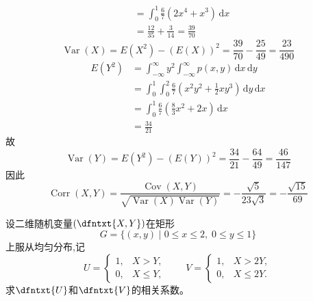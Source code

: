 \documentclass[../main.tex]{subfiles}
\begin{document}
\begin{solution}
\[\begin{aligned}
     &= \int_{0}^{1}\frac{6}{7}\left( 2x^{4}+ x^{3} \right)\,\mathrm{d} x\\ 
      &= \frac{12 }{35 }+ \frac{3}{14}= \frac{39}{70}      
   \end{aligned}
   \] \[
   \operatorname{Var}\left( X \right)= E\left( X^{2} \right)-\left( E\left( X \right)  \right)^{2}= \frac{39}{70}- \frac{25}{49}= \frac{23 }{490 }    
   \] \[
   \begin{aligned}
   E\left( Y^{2} \right)&= \int_{-\infty}^{\infty}y^{2}\int_{-\infty}^{\infty}p\left( x,y \right)\,\mathrm{d} x\,\mathrm{d} y\\ 
    &= \int_{0}^{1}\int_{0}^{2}\frac{6}{7}\left( x^{2}y^{2}+ \frac{1}{2}xy^{3} \right)\,\mathrm{d} y\,\mathrm{d} x\\ 
     &= \int_{0}^{1}\frac{6}{7}\left( \frac{8}{3}x^{2}+ 2x \right)\,\mathrm{d} x\\ 
      &=\frac{34 }{21 } 
   \end{aligned}
   \]故 \[
   \operatorname{Var}\left( Y \right)= E\left( Y^{2} \right)- \left( E\left( Y \right)  \right)^{2}= \frac{34 }{21 }- \frac{64}{49}= \frac{46 }{147 }     
   \]因此 \[
   \operatorname{Corr}\left( X,Y \right)= \frac{\operatorname{Cov}\left( X,Y \right)  }{\sqrt{\operatorname{Var}\left( X \right)\operatorname{Var}\left( Y \right)  } }  =- \frac{\sqrt{5}}{23  \sqrt{3}} = -\frac{\sqrt{15} }{69 } 
   \]
\end{solution}


\begin{exercise}{}{}
设二维随机变量\((\dfntxt{X,Y})\)在矩形
\[
G=\{(x,y)\mid 0\leq x\leq 2,\;0\leq y\leq 1\}
\]
上服从均匀分布,记
\[
U=
\begin{cases}
1, & X>Y,\\
0, & X\leq Y,
\end{cases}
\qquad
V=
\begin{cases}
1, & X>2Y,\\
0, & X\leq 2Y.
\end{cases}
\]
求\(\dfntxt{U}\)和\(\dfntxt{V}\)的相关系数。
\end{exercise}
\end{document}
